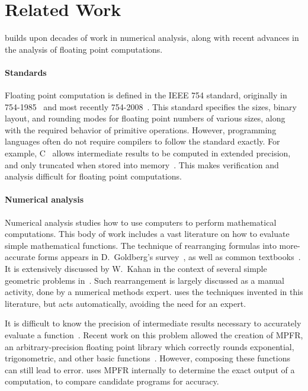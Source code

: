 \documentclass[paper.tex]{subfiles}
\begin{document}
\section{Related Work}
\label{sec:relatedwork}

\casio builds upon decades of work in numerical analysis,
  along with recent advances in the analysis
  of floating point computations.

\paragraph{Standards}
Floating point computation is defined in the IEEE 754 standard,
  originally in 754-1985~\cite{ieee85-standard}
  and most recently 754-2008~\cite{ieee08-standard}.
This standard specifies the sizes, binary layout, and rounding modes
  for floating point numbers of various sizes,
  along with the required behavior of primitive operations.
However, programming languages often
  do not require compilers to follow the standard exactly.
For example, C~\cite{c99} allows intermediate results
  to be computed in extended precision,
  and only truncated when stored into memory~\cite{toplas08-pitfalls-verifying}.
This makes verification and analysis difficult
  for floating point computations.

\paragraph{Numerical analysis}

Numerical analysis studies how to use computers
  to perform mathematical computations.
This body of work includes a vast literature
  on how to evaluate simple mathematical functions.
The technique of rearranging formulas into more-accurate forms
  appears in D.~Goldberg's survey~\cite{acm91-every-scientist},
  as well as common textbooks~\cite{book87-nmse}.
It is extensively discussed by W.~Kahan in the context
  of several simple geometric problems in~\cite{berkeley00-needle-like}.
Such rearrangement is largely discussed as a manual activity,
  done by a numerical methods expert.
\casio uses the techniques invented in this literature,
  but acts automatically, avoiding the need for an expert.

It is difficult to know the precision of intermediate results
  necessary to accurately evaluate a function~\cite{ensl03-table-maker}.
Recent work on this problem allowed the creation of MPFR,
  an arbitrary-precision floating point library
  which correctly rounds exponential, trigonometric, and other basic functions~\cite{acm07-mpfr}.
However, composing these functions can still lead to error.
\casio uses MPFR internally to determine
  the exact output of a computation,
  to compare candidate programs for accuracy.
\end{document}
